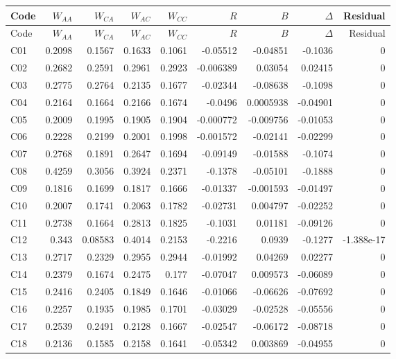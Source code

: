 \documentclass[10pt]{article}
\begin{document}
\small\setlength{\tabcolsep}{6pt}\begin{longtable}{@{}lrrrrrrrr@{}}
\toprule Code & $W_{AA}$ & $W_{CA}$ & $W_{AC}$ & $W_{CC}$ & $R$ & $B$ & $\Delta$ & Residual\\\midrule\endfirsthead
\toprule Code & $W_{AA}$ & $W_{CA}$ & $W_{AC}$ & $W_{CC}$ & $R$ & $B$ & $\Delta$ & Residual\\\midrule\endhead\bottomrule\endfoot
C01 & 0.2098 & 0.1567 & 0.1633 & 0.1061 & -0.05512 & -0.04851 & -0.1036 & 0\\[1pt]
C02 & 0.2682 & 0.2591 & 0.2961 & 0.2923 & -0.006389 & 0.03054 & 0.02415 & 0\\[1pt]
C03 & 0.2775 & 0.2764 & 0.2135 & 0.1677 & -0.02344 & -0.08638 & -0.1098 & 0\\[1pt]
C04 & 0.2164 & 0.1664 & 0.2166 & 0.1674 & -0.0496 & 0.0005938 & -0.04901 & 0\\[1pt]
C05 & 0.2009 & 0.1995 & 0.1905 & 0.1904 & -0.000772 & -0.009756 & -0.01053 & 0\\[1pt]
C06 & 0.2228 & 0.2199 & 0.2001 & 0.1998 & -0.001572 & -0.02141 & -0.02299 & 0\\[1pt]
C07 & 0.2768 & 0.1891 & 0.2647 & 0.1694 & -0.09149 & -0.01588 & -0.1074 & 0\\[1pt]
C08 & 0.4259 & 0.3056 & 0.3924 & 0.2371 & -0.1378 & -0.05101 & -0.1888 & 0\\[1pt]
C09 & 0.1816 & 0.1699 & 0.1817 & 0.1666 & -0.01337 & -0.001593 & -0.01497 & 0\\[1pt]
C10 & 0.2007 & 0.1741 & 0.2063 & 0.1782 & -0.02731 & 0.004797 & -0.02252 & 0\\[1pt]
C11 & 0.2738 & 0.1664 & 0.2813 & 0.1825 & -0.1031 & 0.01181 & -0.09126 & 0\\[1pt]
C12 & 0.343 & 0.08583 & 0.4014 & 0.2153 & -0.2216 & 0.0939 & -0.1277 & -1.388e-17\\[1pt]
C13 & 0.2717 & 0.2329 & 0.2955 & 0.2944 & -0.01992 & 0.04269 & 0.02277 & 0\\[1pt]
C14 & 0.2379 & 0.1674 & 0.2475 & 0.177 & -0.07047 & 0.009573 & -0.06089 & 0\\[1pt]
C15 & 0.2416 & 0.2405 & 0.1849 & 0.1646 & -0.01066 & -0.06626 & -0.07692 & 0\\[1pt]
C16 & 0.2257 & 0.1935 & 0.1985 & 0.1701 & -0.03029 & -0.02528 & -0.05556 & 0\\[1pt]
C17 & 0.2539 & 0.2491 & 0.2128 & 0.1667 & -0.02547 & -0.06172 & -0.08718 & 0\\[1pt]
C18 & 0.2136 & 0.1585 & 0.2158 & 0.1641 & -0.05342 & 0.003869 & -0.04955 & 0\\[1pt]

\end{longtable}
\end{document}
